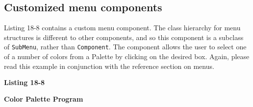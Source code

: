 \subsection*{Customized menu components}

Listing 18-8 contains a custom menu component. The class hierarchy for
menu structures is different to other components, and so this component
is a subclass of \texttt{SubMenu}, rather than
\texttt{Component}. The component allows the user to select one of a
number of colors from a Palette by clicking on the desired box.
Again, please read this example in conjunction with the reference
section on menus.

\bigskip

{\sffamily\bfseries Listing 18-8}

{\sffamily\bfseries Color Palette Program}

